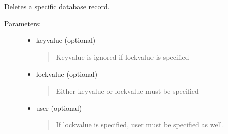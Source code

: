\documentclass[letterpaper,10pt,english]{sphinxmanual}
\begin{document}
\begin{fulllineitems}
\begin{fulllineitems}
\label{knop_database:knop_database.db_registry}
\end{fulllineitems}



\begin{fulllineitems}
\end{fulllineitems}


\begin{fulllineitems}
\label{knop_database:knop_database.deleterecord}
\end{fulllineitems}


\begin{fulllineitems}
Deletes a specific database record.
\begin{description}
\item[{Parameters:}] \leavevmode\begin{itemize}
\item {} 
keyvalue (optional)
\begin{quote}

Keyvalue is ignored if lockvalue is specified
\end{quote}

\item {} 
lockvalue (optional)
\begin{quote}

Either keyvalue or lockvalue must be specified
\end{quote}

\item {} 
user (optional)
\begin{quote}

If lockvalue is specified, user must be specified as well.
\end{quote}

\end{itemize}

\end{description}

\end{fulllineitems}


\end{fulllineitems}
\end{document}
